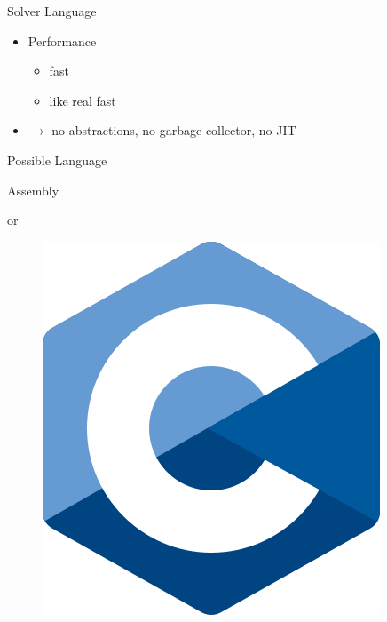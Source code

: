 \documentclass[mathserif,table]{gkibeamer-aaai}
\begin{document}
\begin{frame}
\end{frame}

\begin{frame}{Solver Language}
	\begin{itemize}
		\item Performance
		      \pause
		      \begin{itemize}
			      \item fast
			            \pause
			      \item like real fast
			            \pause
		      \end{itemize}
		\item $\rightarrow$ no abstractions, no garbage collector, no JIT
	\end{itemize}
\end{frame}

\begin{frame}{Possible Language}
	\begin{multicols}{2}
		\begin{center}
			\huge{Assembly}
		\end{center}
		\pause
		\begin{center}
			\huge{or}
		\end{center}
		\columnbreak
		\begin{figure}[ht]
			\includegraphics[scale=0.2]{./figures/c_logo.png}
		\end{figure}
	\end{multicols}
\end{frame}
\end{document}
